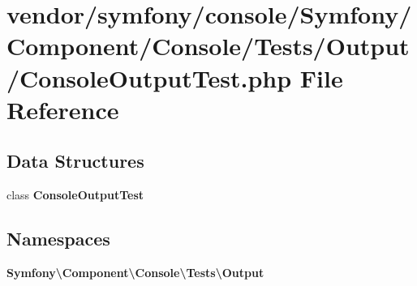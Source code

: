 \section{vendor/symfony/console/\+Symfony/\+Component/\+Console/\+Tests/\+Output/\+Console\+Output\+Test.php File Reference}
\label{_console_output_test_8php}
\subsection*{Data Structures}
\begin{DoxyCompactItemize}
\item 
class {\bf Console\+Output\+Test}
\end{DoxyCompactItemize}
\subsection*{Namespaces}
\begin{DoxyCompactItemize}
\item 
 {\bf Symfony\textbackslash{}\+Component\textbackslash{}\+Console\textbackslash{}\+Tests\textbackslash{}\+Output}
\end{DoxyCompactItemize}

